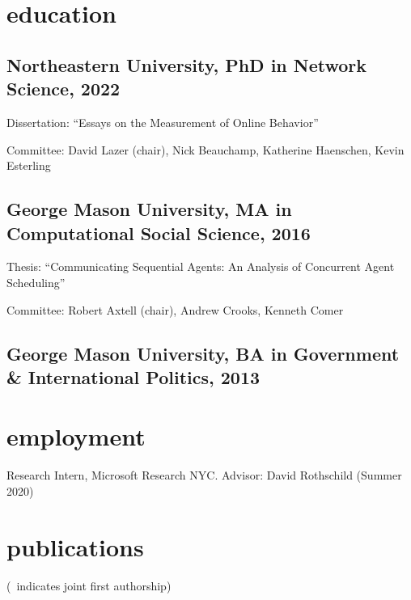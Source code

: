 \documentclass[11pt, letter]{article}
\title{}
\begin{document}
\maketitle

\section{education}
\subsection{Northeastern University, PhD in Network Science, 2022}
Dissertation: ``Essays on the Measurement of Online Behavior''

Committee: David Lazer (chair), Nick Beauchamp, Katherine Haenschen, Kevin Esterling

\subsection{George Mason University, MA in Computational Social Science, 2016}
Thesis: ``Communicating Sequential Agents: An Analysis of Concurrent Agent
Scheduling''

Committee: Robert Axtell (chair), Andrew Crooks, Kenneth Comer
\subsection{George Mason University, BA in Government \& International Politics,
  2013}

\vspace{2mm}

\section{employment}
Research Intern, Microsoft Research NYC. Advisor: David Rothschild (Summer 2020)
\vspace{-1mm}
\section{publications}
\vspace{1mm} {\footnotesize (\textdagger\, indicates joint first authorship)}
\subsection*{} %
\end{document}
